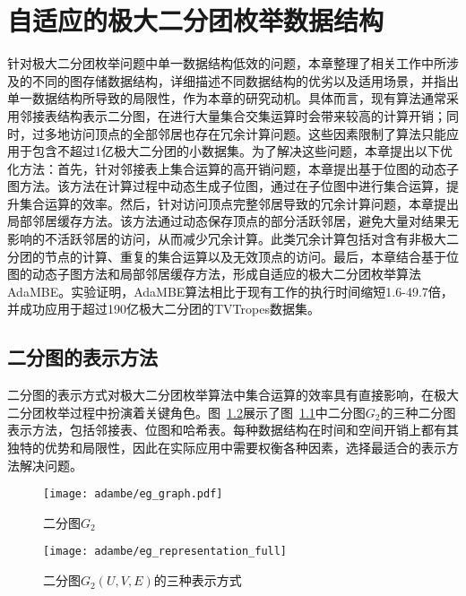 \chapter{自适应的极大二分团枚举数据结构}
\label{ch:adapt_mbe}

针对极大二分团枚举问题中单一数据结构低效的问题，本章整理了相关工作中所涉及的不同的图存储数据结构，详细描述不同数据结构的优劣以及适用场景，并指出单一数据结构所导致的局限性，作为本章的研究动机。具体而言，现有算法通常采用邻接表结构表示二分图，在进行大量集合交集运算时会带来较高的计算开销；同时，过多地访问顶点的全部邻居也存在冗余计算问题。这些因素限制了算法只能应用于包含不超过1亿极大二分团的小数据集。为了解决这些问题，本章提出以下优化方法：首先，针对邻接表上集合运算的高开销问题，本章提出基于位图的动态子图方法。该方法在计算过程中动态生成子位图，通过在子位图中进行集合运算，提升集合运算的效率。然后，针对访问顶点完整邻居导致的冗余计算问题，本章提出局部邻居缓存方法。该方法通过动态保存顶点的部分活跃邻居，避免大量对结果无影响的不活跃邻居的访问，从而减少冗余计算。此类冗余计算包括对含有非极大二分团的节点的计算、重复的集合运算以及无效顶点的访问。最后，本章结合基于位图的动态子图方法和局部邻居缓存方法，形成自适应的极大二分团枚举算法AdaMBE。实验证明，AdaMBE算法相比于现有工作的执行时间缩短1.6-49.7倍，并成功应用于超过190亿极大二分团的TVTropes数据集。

\section{二分图的表示方法}

二分图的表示方式对极大二分团枚举算法中集合运算的效率具有直接影响，在极大二分团枚举过程中扮演着关键角色。图~\ref{fig:ada_graph_format}展示了图~\ref{fig:ada_eg_tree}中二分图$G_2$的三种二分图表示方法，包括邻接表、位图和哈希表。每种数据结构在时间和空间开销上都有其独特的优势和局限性，因此在实际应用中需要权衡各种因素，选择最适合的表示方法解决问题。

\begin{figure} [H]
  \centering
  \texttt{[image: adambe/eg\_graph.pdf]}
  \caption{二分图$G_2$}
  \label{fig:ada_eg_tree}
\end{figure}


\begin{figure} [H]
	\centering
  \vspace{0.1in}
	\texttt{[image: adambe/eg\_representation\_full]}
  \vspace{0.2in}
	\caption{二分图$G_2(U,V,E)$的三种表示方式}

	\label{fig:ada_graph_format}
\end{figure}

